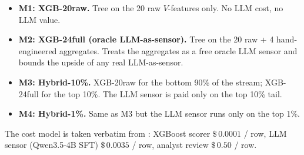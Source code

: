 \begin{itemize}
\item \textbf{M1: XGB-20raw.} Tree on the 20 raw $V$-features only.
  No LLM cost, no LLM value.
\item \textbf{M2: XGB-24full (oracle LLM-as-sensor).} Tree on the 20
  raw + 4 hand-engineered aggregates. Treats the aggregates as a free
  oracle LLM sensor and bounds the upside of any real LLM-as-sensor.
\item \textbf{M3: Hybrid-10\%.} XGB-20raw for the bottom 90\% of the
  stream; XGB-24full for the top 10\%. The LLM sensor is paid only
  on the top 10\% tail.
\item \textbf{M4: Hybrid-1\%.} Same as M3 but the LLM sensor runs
  only on the top 1\%.
\end{itemize}

The cost model is taken verbatim from
: XGBoost scorer
$\$\,0.0001$ / row, LLM sensor (Qwen3.5-4B SFT) $\$\,0.0035$ / row,
analyst review $\$\,0.50$ / row.

